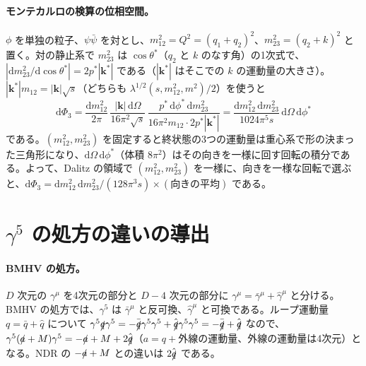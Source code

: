 \documentclass[a4paper,10pt]{ltjsarticle}
\newcommand{\dd}{\mathrm{d}}
\begin{document}
\paragraph{モンテカルロの検算の位相空間。}$\phi$ を単独の粒子、$\psi\bar\psi$ を対とし、$m_{12}^2=Q^2=(q_1+q_2)^2$、$m_{23}^2=(q_2+k)^2$ と置く。対の静止系で $m_{23}^2$ は $\cos\theta^*$（$q_2$ と $k$ のなす角）の1次式で、$|\dd m_{23}^2/\dd\cos\theta^*|=2p^*|\boldsymbol k^*|$ である（$|\boldsymbol k^*|$ はそこでの $k$ の運動量の大きさ）。$|\boldsymbol k^*|m_{12}=|\boldsymbol k|\sqrt s$（どちらも $\lambda^{1/2}(s,m_{12}^2,m^2)/2$）を使うと
\begin{equation*}
\dd\Phi_3=\frac{\dd m_{12}^2}{2\pi}\,\frac{|\boldsymbol k|\,\dd\Omega}{16\pi^2\sqrt s}\,\frac{p^*\,\dd\phi^*\,\dd m_{23}^2}{16\pi^2m_{12}\cdot2p^*|\boldsymbol k^*|}
=\frac{\dd m_{12}^2\,\dd m_{23}^2}{1024\pi^5s}\,\dd\Omega\,\dd\phi^*
\end{equation*}
である。$(m_{12}^2,m_{23}^2)$ を固定すると終状態の3つの運動量は重心系で形の決まった三角形になり、$\dd\Omega\,\dd\phi^*$（体積 $8\pi^2$）はその向きを一様に回す回転の積分である。よって、Dalitz の領域で $(m_{12}^2,m_{23}^2)$ を一様に、向きを一様な回転で選ぶと、$\dd\Phi_3=\dd m_{12}^2\,\dd m_{23}^2/(128\pi^3s)\times(\text{向きの平均})$ である。

\section{$\gamma^5$ の処方の違いの導出}\label{app:bmhv}

\paragraph{BMHV の処方。}$D$ 次元の $\gamma^\mu$ を4次元の部分と $D-4$ 次元の部分に $\gamma^\mu=\bar\gamma^\mu+\hat\gamma^\mu$ と分ける。BMHV の処方では、$\gamma^5$ は $\bar\gamma^\mu$ と反可換、$\hat\gamma^\mu$ と可換である。ループ運動量 $q=\bar q+\hat q$ について $\gamma^5\slashed q\gamma^5=-\bar{\slashed q}\gamma^5\gamma^5+\hat{\slashed q}\gamma^5\gamma^5=-\bar{\slashed q}+\hat{\slashed q}$ なので、$\gamma^5(\slashed a+M)\gamma^5=-\slashed a+M+2\hat{\slashed q}$（$a=q+$外線の運動量、外線の運動量は4次元）となる。NDR の $-\slashed a+M$ との違いは $2\hat{\slashed q}$ である。
\end{document}
